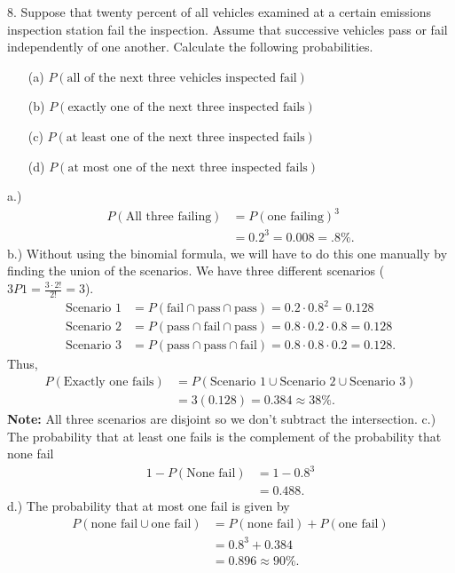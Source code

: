 \documentclass{report}
\begin{document}
    \pagebreak \bigbreak \noindent 
    \begin{mdframed}
        8. Suppose that twenty percent of all vehicles examined at a certain emissions inspection station fail the inspection. Assume that successive vehicles pass or fail independently of one another. Calculate the following probabilities.
        \begin{itemize}
            \item[(a)] \(P(\text{all of the next three vehicles inspected fail})\)
            \item[(b)] \(P(\text{exactly one of the next three inspected fails})\)
            \item[(c)] \(P(\text{at least one of the next three inspected fails})\)
            \item[(d)] \(P(\text{at most one of the next three inspected fails})\)
        \end{itemize}
    \end{mdframed}
    \bigbreak \noindent 
    a.)
    \begin{align*}
        P(\text{All three failing}) &= P(\text{one failing})^{3} \\
        &=0.2^{3} = 0.008 = .8\%
    .\end{align*}
    \bigbreak \noindent 
    b.) Without using the binomial formula, we will have to do this one manually by finding the union of the scenarios. We have three different scenarios ($3P1 = \frac{3 \cdot 2!}{2!} = 3$). 
    \begin{align*}
        \text{Scenario 1} &= P(\text{fail} \cap \text{pass} \cap \text{pass}) = 0.2 \cdot 0.8^{2}  = 0.128\\
        \text{Scenario 2} &= P(\text{pass} \cap \text{fail} \cap \text{pass}) =0.8 \cdot 0.2 \cdot 0.8 = 0.128\\
        \text{Scenario 3} &= P(\text{pass} \cap \text{pass} \cap \text{fail})  = 0.8 \cdot 0.8 \cdot 0.2 = 0.128
    .\end{align*}
    \bigbreak \noindent 
    Thus, 
    \begin{align*}
        P(\text{Exactly one fails}) &= P(\text{Scenario 1} \cup \text{Scenario 2} \cup \text{Scenario 3}) \\
        &= 3(0.128) = 0.384 \approx 38\%
    .\end{align*}
    \bigbreak \noindent 
    \textbf{Note:} All three scenarios are disjoint so we don't subtract the intersection.
    \bigbreak \noindent 
    c.) The probability that at least one fails is the complement of the probability that none fail
    \begin{align*}
        1-P(\text{None fail})  &= 1-0.8^{3} \\
       &=0.488
    .\end{align*}
    \bigbreak \noindent 
    d.) The probability that at most one fail is given by
    \begin{align*}
        P(\text{none fail} \cup \text{one fail}) &= P(\text{none fail}) + P(\text{one fail}) \\
        &=0.8^{3} + 0.384 \\
        &=0.896 \approx 90\%
    .\end{align*}


 
\end{document}
